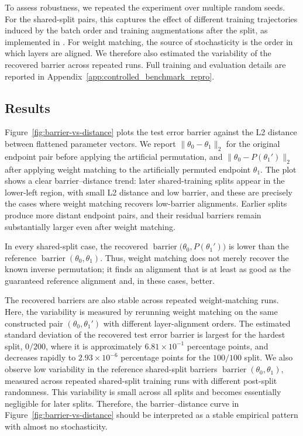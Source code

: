 \documentclass[11pt,a4paper]{report}
\begin{document}
To assess robustness, we repeated the experiment over multiple random seeds. For the shared-split pairs, this captures the effect of different training trajectories induced by the batch order and training augmentations after the split, as implemented in \citet{frankle2020linear}. For weight matching, the source of stochasticity is the order in which layers are aligned. We therefore also estimated the variability of the recovered barrier across repeated runs. Full training and evaluation details are reported in Appendix~\ref{app:controlled_benchmark_repro}.


\subsection{Results}
Figure~\ref{fig:barrier-vs-distance} plots the test error barrier against the L2 distance between flattened parameter vectors. We report \(\|\theta_0-\theta_1\|_2\) for the original endpoint pair before applying the artificial permutation, and \(\|\theta_0-P(\theta_1')\|_2\) after applying weight matching to the artificially permuted endpoint $\theta_1$. The plot shows a clear barrier--distance trend: later shared-training splits appear in the lower-left region, with small L2 distance and low barrier, and these are precisely the cases where weight matching recovers low-barrier alignments. Earlier splits produce more distant endpoint pairs, and their residual barriers remain substantially larger even after weight matching.

In every shared-split case, the recovered \(\operatorname{barrier}\bigl(\theta_0,P(\theta_1')\bigr)\) is lower than the reference \(\operatorname{barrier}(\theta_0,\theta_1)\). Thus, weight matching does not merely recover the known inverse permutation; it finds an alignment that is at least as good as the guaranteed reference alignment and, in these cases, better.

The recovered barriers are also stable across repeated weight-matching runs. Here, the variability is measured by rerunning weight matching on the same constructed pair \((\theta_0,\theta_1')\) with different layer-alignment orders. The estimated standard deviation of the recovered test error barrier is largest for the hardest split, \(0/200\), where it is approximately \(6.81\times 10^{-1}\) percentage points, and decreases rapidly to \(2.93\times 10^{-6}\) percentage points for the \(100/100\) split. We also observe low variability in the reference shared-split barriers \(\operatorname{barrier}(\theta_0,\theta_1)\), measured across repeated shared-split training runs with different post-split randomness. This variability is small across all splits and becomes essentially negligible for later splits. Therefore, the barrier--distance curve in Figure~\ref{fig:barrier-vs-distance} should be interpreted as a stable empirical pattern with almost no stochasticity.
\end{document}
